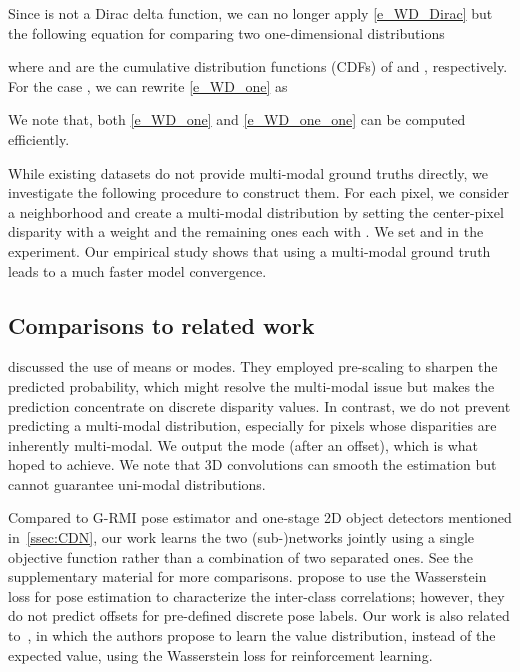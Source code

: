 \documentclass{article}
\begin{document}
Since  is not a Dirac delta function, we can no longer apply \autoref{e_WD_Dirac} but the following equation for comparing two one-dimensional distributions \cite{panaretos2020invitation,Wasserman20,ramdas2017wasserstein}

where  and  are the cumulative distribution functions (CDFs) of  and , respectively. For the case , we can rewrite \autoref{e_WD_one} as \cite{thorpeintroduction}

We note that, both \autoref{e_WD_one} and \autoref{e_WD_one_one} can be computed efficiently.

While existing datasets do not provide multi-modal ground truths directly, we investigate the following procedure to construct them. For each pixel, we consider a  neighborhood and create a multi-modal distribution by setting the center-pixel disparity with a weight  and the remaining ones each with . We set  and  in the experiment. Our empirical study shows that using a multi-modal ground truth leads to a much faster model convergence.

\subsection{Comparisons to related work}
\citet{kendall2017end} discussed the use of means or modes. They employed pre-scaling to sharpen the predicted probability, which might resolve the multi-modal issue but makes the prediction concentrate on discrete disparity values. In contrast, we do not prevent predicting a multi-modal distribution, especially for pixels whose disparities are inherently multi-modal. We output the mode (after an offset), which is what \citet{kendall2017end} hoped to achieve.
We note that 3D convolutions can smooth the estimation but cannot guarantee uni-modal distributions. 

Compared to G-RMI pose estimator and one-stage 2D object detectors mentioned in~\autoref{ssec:CDN}, our work learns the two (sub-)networks jointly using a single objective function rather than a combination of two separated ones. See the supplementary material for more comparisons. \citet{liu2019conservative} propose to use the Wasserstein loss for pose estimation to characterize the inter-class correlations; however, they do not predict offsets for pre-defined discrete pose labels. Our work is also related to~\cite{bellemare2017distributional}, in which the authors propose to learn the value distribution, instead of the expected value, using the Wasserstein loss for reinforcement learning.
\end{document}
